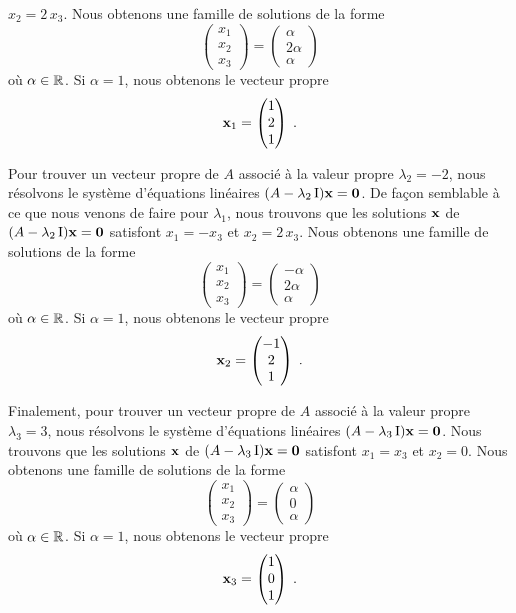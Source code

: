 {\begin{egg}
$x_2 = 2\,x_3$.  Nous obtenons une famille de solutions de la forme
\[
\begin{pmatrix}
x_1 \\ x_2 \\ x_3
\end{pmatrix}
=
\begin{pmatrix}
\alpha \\ 2\alpha \\ \alpha
\end{pmatrix}
\]
où $\alpha \in \mathbb{R}$.  Si $\alpha = 1$, nous obtenons le vecteur propre
\[
\mathbf{x}_1 =
\begin{pmatrix}
1 \\ 2 \\ 1
\end{pmatrix} \; .
\]

Pour trouver un vecteur propre de $A$ associé à la valeur propre
$\lambda_2=-2$, nous résolvons le système d'équations linéaires
$(A -\lambda_2 \operatorname{I}) \mathbf{x} = \mathbf{0}$.  De façon semblable à ce
que nous venons de faire pour $\lambda_1$, nous trouvons que les solutions
$\mathbf{x}$ de $(A -\lambda_2 \operatorname{I}) \mathbf{x} = \mathbf{0}$ satisfont
$x_1 = - x_3$ et $x_2 = 2\,x_3$.  Nous obtenons une famille de solutions
de la forme
\[
\begin{pmatrix}
x_1 \\ x_2 \\ x_3
\end{pmatrix}
=
\begin{pmatrix}
-\alpha \\ 2\alpha \\ \alpha
\end{pmatrix}
\]
où $\alpha \in \mathbb{R}$.  Si $\alpha = 1$, nous obtenons le vecteur propre
\[
\mathbf{x}_2 =
\begin{pmatrix}
-1 \\ 2 \\ 1
\end{pmatrix} \; .
\]

Finalement, pour trouver un vecteur propre de $A$ associé à la valeur
propre $\lambda_3=3$, nous résolvons le système d'équations
linéaires $(A -\lambda_3 \operatorname{I}) \mathbf{x} = \mathbf{0}$.  Nous trouvons que
les solutions $\mathbf{x}$ de $(A -\lambda_3 \operatorname{I}) \mathbf{x} = \mathbf{0}$
satisfont $x_1 = x_3$ et $x_2 = 0$.  Nous obtenons une famille de
solutions de la forme
\[
\begin{pmatrix}
x_1 \\ x_2 \\ x_3
\end{pmatrix}
=
\begin{pmatrix}
\alpha \\ 0 \\ \alpha
\end{pmatrix}
\]
où $\alpha \in \mathbb{R}$.  Si $\alpha = 1$, nous obtenons le vecteur propre
\[
\mathbf{x}_3 =
\begin{pmatrix}
1 \\ 0 \\ 1
\end{pmatrix} \; .
\]
\end{egg}

}
